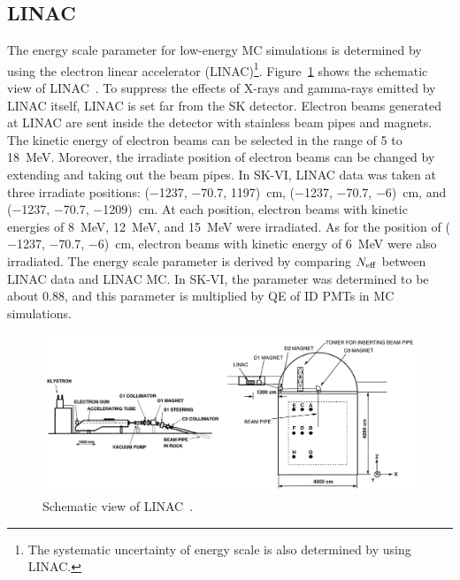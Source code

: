 \subsection{LINAC}
\vs\hs
The energy scale parameter for low-energy MC simulations is determined by using the electron linear accelerator (LINAC)\footnote{The systematic uncertainty of energy scale is also determined by using LINAC.}.
Figure~\ref{Calibration_LINAC} shows the schematic view of LINAC~\cite{1999Nakahata}.
To suppress the effects of X-rays and gamma-rays emitted by LINAC itself, LINAC is set far from the SK detector.
Electron beams generated at LINAC are sent inside the detector with stainless beam pipes and magnets.
The kinetic energy of electron beams can be selected in the range of 5 to 18~MeV.
Moreover, the irradiate position of electron beams can be changed by extending and taking out the beam pipes.
In SK-VI, LINAC data was taken at three irradiate positions: ($-$1237, $-$70.7, 1197)~cm, ($-$1237, $-$70.7, $-$6)~cm, and ($-$1237, $-$70.7, $-$1209)~cm.
At each position, electron beams with kinetic energies of 8~MeV, 12~MeV, and 15~MeV were irradiated.
As for the position of ($-$1237, $-$70.7, $-$6)~cm, electron beams with kinetic energy of 6~MeV were also irradiated.
The energy scale parameter is derived by comparing $N_{\rm eff}$ between LINAC data and LINAC MC.
In SK-VI, the parameter was determined to be about 0.88, and this parameter is multiplied by QE of ID PMTs in MC simulations.

\begin{figure}[tbp]
	\centering
	\includegraphics[width=16cm]{Figures/Calibration/LINAC}
	\caption[Schematic view of LINAC]{
	Schematic view of LINAC~\cite{1999Nakahata}.
	}\label{Calibration_LINAC}
\end{figure}





\newpage

